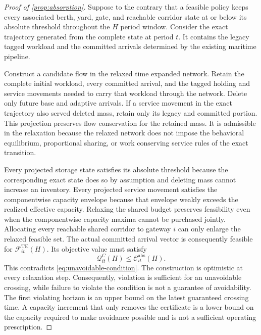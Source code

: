 \documentclass[a4paper,fleqn]{cas-sc}
\begin{document}
\begin{proof}[Proof of \cref{prop:absorption}]
Suppose to the contrary that a feasible policy keeps every associated berth,
yard, gate, and reachable corridor state at or below its absolute threshold
throughout the $H$ period window. Consider the exact trajectory generated from
the complete state at period $t$. It contains the legacy tagged workload and
the committed arrivals determined by the existing maritime pipeline.

Construct a candidate flow in the relaxed time expanded network. Retain the
complete initial workload, every committed arrival, and the tagged holding and
service movements needed to carry that workload through the network. Delete
only future base and adaptive arrivals. If a service movement in the exact
trajectory also served deleted mass, retain only its legacy and committed
portion. This projection preserves flow conservation for the retained mass.
It is admissible in the relaxation because the relaxed network does not impose
the behavioral equilibrium, proportional sharing, or work conserving service
rules of the exact transition.

Every projected storage state satisfies its absolute threshold because the
corresponding exact state does so by assumption and deleting mass cannot
increase an inventory. Every projected service movement satisfies the
componentwise capacity envelope because that envelope weakly exceeds the
realized effective capacity. Relaxing the shared budget preserves feasibility
even when the componentwise capacity maxima cannot be purchased jointly.
Allocating every reachable shared corridor to gateway $i$ can only enlarge the
relaxed feasible set. The actual committed arrival vector is consequently
feasible for $\mathcal F^{\mathrm{TE}}_{it}(H)$. Its objective value must satisfy
\[
 \mathcal Q^C_{it}(H)
 \le\mathcal C^{\mathrm{abs}}_{it}(H).
\]
This contradicts \cref{eq:unavoidable-condition}. The construction is
optimistic at every relaxation step. Consequently, violation is sufficient for
an unavoidable crossing, while failure to violate the condition is not a
guarantee of avoidability. The first violating horizon is an upper bound on the
latest guaranteed crossing time. A capacity increment that only removes the
certificate is a lower bound on the capacity required to make avoidance
possible and is not a sufficient operating prescription.
\end{proof}
\end{document}
